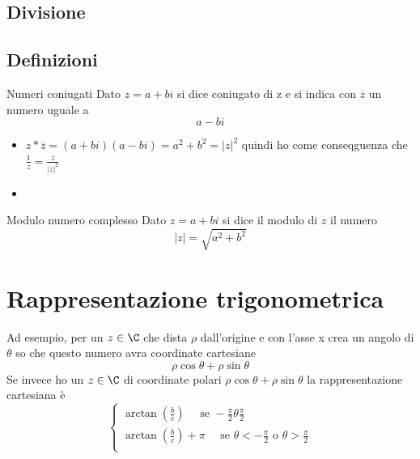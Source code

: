 \subsection{Divisione}
\subsection{Definizioni}
\begin{definizione}{Numeri coniugati
	}
	Dato $z = a + bi$ si dice coniugato di z e si indica con $ \overline{z} $ un numero uguale a \[
		a - bi
	\]
\end{definizione}

\begin{itemize}
	\item $z * \overline{z} = \left( a+bi \right) \left( a-bi \right)  = a^2 + b^2= \left|z\right|^2$ quindi ho come conseqguenza che $\frac{1}{z}= \frac{\overline{z}}{\left|z\right|^2}$
	\item
\end{itemize}
\begin{definizione}{Modulo numero complesso}
	Dato $z = a + bi$ si dice il modulo di $z$ il numero \[
		\left|z\right| = \sqrt{a^2 + b ^2}
	\]
\end{definizione}

\section{Rappresentazione trigonometrica}
Ad esempio, per un $z  \in  \C $ che dista $\rho$ dall'origine e con l'asse x crea un angolo di $ \theta$ so che questo numero avra coordinate cartesiane
\[
	\rho \cos \theta + \rho \sin \theta
\]
Se invece ho un $ z  \in  \C$ di coordinate polari $\rho \cos \theta + \rho \sin \theta $ la rappresentazione cartesiana è
\[
	\begin{cases}
		\arctan \left( \frac{b}{c} \right) \quad \text{ se } -\frac{\pi}{2} \theta \frac{\pi}{2}                           \\
		\arctan \left( \frac{b}{c} \right) + \pi \quad \text{ se } \theta < -\frac{\pi}{2} \text{ o }\theta >\frac{\pi}{2} \\
	\end{cases}
\]
